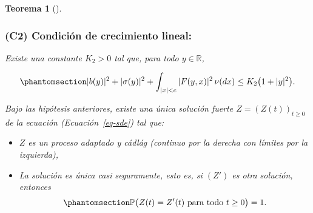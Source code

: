 \documentclass[
  spanish,
  us-letterpaper,
]{scrreprt}
\providecommand{\tightlist}{%
  \setlength{\itemsep}{0pt}\setlength{\parskip}{0pt}}
\theoremstyle{plain}
\theoremstyle{plain}
\theoremstyle{definition}
\theoremstyle{plain}
\newtheorem{theorem}{Teorema}[chapter]
\theoremstyle{remark}
\begin{document}
\begin{theorem}[]
\subsubsection{(C2) Condición de crecimiento
lineal:}\label{c2-condiciuxf3n-de-crecimiento-lineal}

Existe una constante \(K_2 > 0\) tal que, para todo
\(y \in \mathbb{R}\),

\begin{equation}\phantomsection\label{eq-3}{
|b(y)|^2 + |\sigma(y)|^2 + \int_{|x| < c} |F(y, x)|^2 \, \nu(dx)
\leq K_2 \bigl(1 + |y|^2 \bigr).
}\end{equation}

Bajo las hipótesis anteriores, existe una única solución fuerte
\(Z = (Z(t))_{t \geq 0}\) de la ecuación (Ecuación~\ref{eq-sde}) tal
que:

\begin{itemize}
\tightlist
\item
  \(Z\) es un proceso adaptado y cádlág (continuo por la derecha con
  límites por la izquierda),
\item
  La solución es única casi seguramente, esto es, si \((Z')\) es otra
  solución, entonces \begin{equation}\phantomsection\label{eq-4}{
   \mathbb{P}\bigl(Z(t) = Z'(t) \text{ para todo } t \geq 0\bigr) = 1.
   }\end{equation}
\end{itemize}

\end{theorem}
\end{document}
